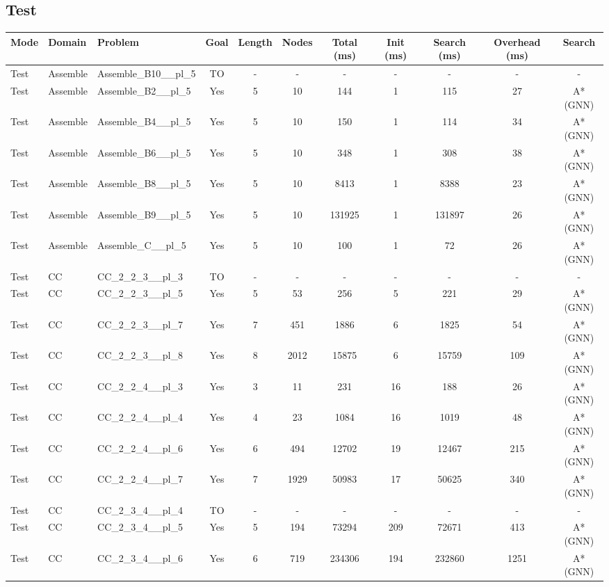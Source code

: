 \documentclass{article}
\begin{document}
\subsection*{Test}
\begin{tabular}{lllcccccccc}
\toprule
Mode & Domain & Problem & Goal & Length & Nodes & Total (ms) & Init (ms) & Search (ms) & Overhead (ms) & Search \\
\midrule
Test & Assemble & Assemble\_B10\_\_pl\_5 & TO & - & - & - & - & - & - & - \\
Test & Assemble & Assemble\_B2\_\_pl\_5 & Yes & 5 & 10 & 144 & 1 & 115 & 27 & A*(GNN) \\
Test & Assemble & Assemble\_B4\_\_pl\_5 & Yes & 5 & 10 & 150 & 1 & 114 & 34 & A*(GNN) \\
Test & Assemble & Assemble\_B6\_\_pl\_5 & Yes & 5 & 10 & 348 & 1 & 308 & 38 & A*(GNN) \\
Test & Assemble & Assemble\_B8\_\_pl\_5 & Yes & 5 & 10 & 8413 & 1 & 8388 & 23 & A*(GNN) \\
Test & Assemble & Assemble\_B9\_\_pl\_5 & Yes & 5 & 10 & 131925 & 1 & 131897 & 26 & A*(GNN) \\
Test & Assemble & Assemble\_C\_\_pl\_5 & Yes & 5 & 10 & 100 & 1 & 72 & 26 & A*(GNN) \\
Test & CC & CC\_2\_2\_3\_\_pl\_3 & TO & - & - & - & - & - & - & - \\
Test & CC & CC\_2\_2\_3\_\_pl\_5 & Yes & 5 & 53 & 256 & 5 & 221 & 29 & A*(GNN) \\
Test & CC & CC\_2\_2\_3\_\_pl\_7 & Yes & 7 & 451 & 1886 & 6 & 1825 & 54 & A*(GNN) \\
Test & CC & CC\_2\_2\_3\_\_pl\_8 & Yes & 8 & 2012 & 15875 & 6 & 15759 & 109 & A*(GNN) \\
Test & CC & CC\_2\_2\_4\_\_pl\_3 & Yes & 3 & 11 & 231 & 16 & 188 & 26 & A*(GNN) \\
Test & CC & CC\_2\_2\_4\_\_pl\_4 & Yes & 4 & 23 & 1084 & 16 & 1019 & 48 & A*(GNN) \\
Test & CC & CC\_2\_2\_4\_\_pl\_6 & Yes & 6 & 494 & 12702 & 19 & 12467 & 215 & A*(GNN) \\
Test & CC & CC\_2\_2\_4\_\_pl\_7 & Yes & 7 & 1929 & 50983 & 17 & 50625 & 340 & A*(GNN) \\
Test & CC & CC\_2\_3\_4\_\_pl\_4 & TO & - & - & - & - & - & - & - \\
Test & CC & CC\_2\_3\_4\_\_pl\_5 & Yes & 5 & 194 & 73294 & 209 & 72671 & 413 & A*(GNN) \\
Test & CC & CC\_2\_3\_4\_\_pl\_6 & Yes & 6 & 719 & 234306 & 194 & 232860 & 1251 & A*(GNN) \\

\end{tabular}
\end{document}

